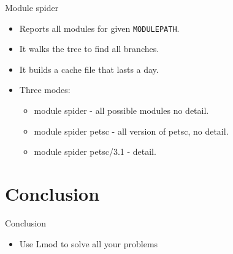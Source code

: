 \documentclass{beamer}
\begin{document}
\begin{frame}{Module spider}
  \begin{itemize}
    \item Reports all modules for given \texttt{MODULEPATH}.
    \item It walks the tree to find all branches.
    \item It builds a cache file that lasts a day.
    \item Three modes:
      \begin{itemize}
        \item module spider - all possible modules no detail.
        \item module spider petsc - all version of petsc, no detail.
        \item module spider petsc/3.1 - detail.
      \end{itemize}
  \end{itemize}
\end{frame}


\section{Conclusion}

\begin{frame}{Conclusion}
  \begin{itemize}
    \item Use Lmod to solve all your problems
  \end{itemize}
\end{frame}
\end{document}
